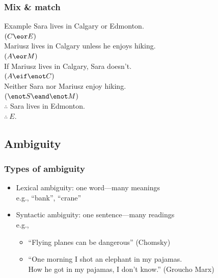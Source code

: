 \begin{frame}
  \frametitle{Mix \& match}

  \begin{block}{Example}
  Sara lives in Calgary or Edmonton.\\
  \alert{$(C \eor E)$}\\
  Mariusz lives in Calgary unless he enjoys hiking.\\
  \alert{$(A \eor M)$}\\
  If Mariusz lives in Calgary, Sara doesn't.\\
  \alert{$(A \eif \enot C)$}\\
  Neither Sara nor Mariusz enjoy hiking.\\
  \alert{$( \enot S \eand\enot M)$}\\
  $\therefore$ Sara lives in Edmonton.\\
  \alert{$\therefore\ E$}.
  \end{block}
\end{frame}

\subsection{Ambiguity}

\begin{frame}
    \frametitle{Types of ambiguity}

\begin{itemize}
  \item Lexical ambiguity: one word---many meanings \\
  e.g., ``bank'', ``crane''
  \item Syntactic ambiguity: one sentence---many readings\\
  e.g.,
  \begin{itemize}
  \item ``Flying planes can be dangerous'' (Chomsky)
  \item ``One morning I shot an elephant in my pajamas.\\ How he got in my pajamas, I don't know.'' (Groucho Marx)
  \end{itemize}
\end{itemize}

\end{frame}

